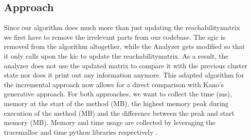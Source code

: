 \subsection{Approach} \label{exp1:approach}
Since our algorithm does much more than just updating the reachabilitymatrix we first have to remove the irrelevant parts from our codebase. The \acrlong{sgic} is removed from the algorithm altogether, while the Analyzer gets modified so that it only calls upon the \acrlong{kic} to update the reachabilitymatrix. As a result, the analyzer does not use the updated matrix to compare it with the previous cluster state nor does it print out any information anymore. This adapted algorithm for the incremental approach now allows for a direct comparison with Kano's generative approach.  For both approaches, we want to collect the time (ms), memory at the start of the method (MB), the highest memory peak during execution of the method (MB) and the difference between the peak and start memory (MB). Memory and time usage are collected by leveraging the tracemalloc and time python libraries respectively \cite{tracemalloc} \cite{time}.
\\[10pt]


